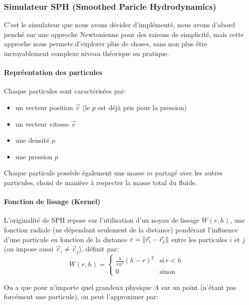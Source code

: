 \documentclass{article}
\begin{document}
\subsubsection{Simulateur SPH (Smoothed Paricle Hydrodynamics)}

C'est le simulateur que nous avons décider d'implémenté, nous avons d'abord penché sur une approche Newtonienne pour des raisons de simplicité, mais cette approche nous permets d'explorer plus de choses, sans non plus être incroyablement complexe niveau théorique ou pratique.

\paragraph{Repréentation des particules}

Chaque particules sont caractérisées par:

\begin{itemize}
    \item un vecteur position \(\vec{r}\) (le \(p\) est déjà pris pour la pression)
    \item un vecteur vitesse \(\vec{v}\)
    \item une densité \(\rho\)
    \item une pression \(p\)
\end{itemize}

Chaque particule possède également une masse \(m\) partagé avec les autres particules, choisi de manière à respecter la masse total du fluide.

\paragraph{Fonction de lissage (Kernel)}

L'originalité de SPH repose sur l'utilisation d'un noyau de lissage \(W(r, h)\), une fonction radiale (ne dépendant seulement de la distance) pondérant l'influence d'une particule en fonction de la distance \(r = \norm{\vec{r}_i - \vec{r}_j}\) entre les particules \(i\) et \(j\) (on impose aussi \(\vec{r}_i \ne \vec{r}_j\)), définit par:
\[ W(r, h) = \begin{cases}
        \frac{4}{\pi h^3}(h-r)^2 & \text{si}\, r < h \\
        0 & \text{sinon}
    \end{cases}
\]

On a que pour n'importe quel grandeux physique \(A\) sur un point (n'étant pas forcément une particule), on peut l'approximer par:
\end{document}
